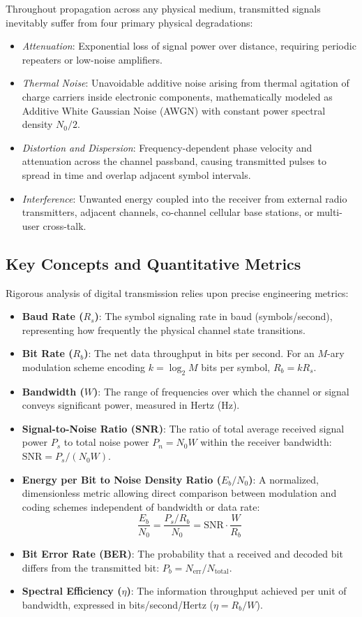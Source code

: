 \documentclass[10pt,twocolumn]{article}
\begin{document}
Throughout propagation across any physical medium, transmitted signals inevitably suffer from four primary physical degradations:
\begin{itemize}
    \item \textit{Attenuation}: Exponential loss of signal power over distance, requiring periodic repeaters or low-noise amplifiers.
    \item \textit{Thermal Noise}: Unavoidable additive noise arising from thermal agitation of charge carriers inside electronic components, mathematically modeled as Additive White Gaussian Noise (AWGN) with constant power spectral density $N_0/2$.
    \item \textit{Distortion and Dispersion}: Frequency-dependent phase velocity and attenuation across the channel passband, causing transmitted pulses to spread in time and overlap adjacent symbol intervals.
    \item \textit{Interference}: Unwanted energy coupled into the receiver from external radio transmitters, adjacent channels, co-channel cellular base stations, or multi-user cross-talk.
\end{itemize}

\subsection{Key Concepts and Quantitative Metrics}
Rigorous analysis of digital transmission relies upon precise engineering metrics:
\begin{itemize}
    \item \textbf{Baud Rate ($R_s$)}: The symbol signaling rate in baud (symbols/second), representing how frequently the physical channel state transitions.
    \item \textbf{Bit Rate ($R_b$)}: The net data throughput in bits per second. For an $M$-ary modulation scheme encoding $k = \log_2 M$ bits per symbol, $R_b = k R_s$.
    \item \textbf{Bandwidth ($W$)}: The range of frequencies over which the channel or signal conveys significant power, measured in Hertz (Hz).
    \item \textbf{Signal-to-Noise Ratio (SNR)}: The ratio of total average received signal power $P_s$ to total noise power $P_n = N_0 W$ within the receiver bandwidth: $\text{SNR} = P_s / (N_0 W)$.
    \item \textbf{Energy per Bit to Noise Density Ratio ($E_b/N_0$)}: A normalized, dimensionless metric allowing direct comparison between modulation and coding schemes independent of bandwidth or data rate:
    \begin{equation}
    \frac{E_b}{N_0} = \frac{P_s / R_b}{N_0} = \text{SNR} \cdot \frac{W}{R_b}
    \end{equation}
    \item \textbf{Bit Error Rate (BER)}: The probability that a received and decoded bit differs from the transmitted bit: $P_b = N_{\text{err}} / N_{\text{total}}$.
    \item \textbf{Spectral Efficiency ($\eta$)}: The information throughput achieved per unit of bandwidth, expressed in bits/second/Hertz ($\eta = R_b / W$).
\end{itemize}
\end{document}
